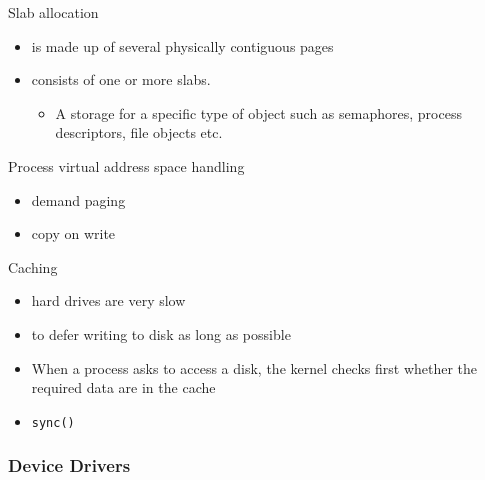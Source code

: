 \begin{frame}
  \begin{block}{Slab allocation}
    \begin{itemize}
    \item[Slab] is made up of several physically contiguous pages
    \item[Cache] consists of one or more slabs.
      \begin{itemize}
      \item A storage for a specific type of object such as semaphores, process
        descriptors, file objects etc.
      \end{itemize}
    \end{itemize}
  \end{block}
  \begin{center}
  \end{center}
\end{frame}

\begin{frame}
  \begin{block}{Process virtual address space handling}
    \begin{itemize}
    \item demand paging
    \item copy on write
    \end{itemize}
  \end{block}
\end{frame}

\begin{frame}
  \begin{block}{Caching}
    \begin{itemize}
    \item hard drives are very slow
    \item to defer writing to disk as long as possible
    \item When a process asks to access a disk, the kernel checks first whether the
      required data are in the cache
    \item \texttt{sync()}
    \end{itemize}
  \end{block}
\end{frame}

\subsubsection{Device Drivers}

